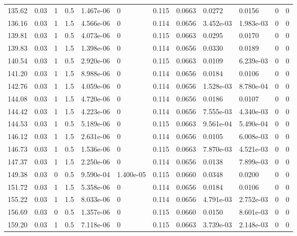 \documentclass[preview]{standalone}
\begin{document}
{{{\begin{tabular}{L{1.2cm}C{1.2cm} C{0.3cm}C{0.5cm} C{1.4cm}C{1.4cm} C{1.4cm}C{1.4cm} C{1.6cm}C{1.6cm} C{1.6cm}C{1.6cm}}
  135.62  &  0.03  & 1     & 0.5 &  1.467e-06  & 0  &  0.115&   0.0663& 0.0272 & 0.0156   &  0 & 0  \\ 
  136.16  &  0.03  & 1     & 1.5 &  4.566e-06  & 0  &  0.114&   0.0656& 3.452e-03 & 1.983e-03   &  0 & 0  \\ 
  139.81  &  0.03  & 1     & 0.5 &  4.073e-06  & 0  &  0.115&   0.0663& 0.0295 & 0.0170   &  0 & 0  \\ 
  139.83  &  0.03  & 1     & 1.5 &  1.398e-06  & 0  &  0.114&   0.0656& 0.0330 & 0.0189   &  0 & 0  \\ 
  140.54  &  0.03  & 1     & 0.5 &  2.920e-06  & 0  &  0.115&   0.0663& 0.0109 & 6.239e-03   &  0 & 0  \\ 
  141.20  &  0.03  & 1     & 1.5 &  8.988e-06  & 0  &  0.114&   0.0656& 0.0184 & 0.0106   &  0 & 0  \\ 
  142.76  &  0.03  & 1     & 1.5 &  4.059e-06  & 0  &  0.114&   0.0656& 1.528e-03 & 8.780e-04   &  0 & 0  \\ 
  144.08  &  0.03  & 1     & 1.5 &  4.720e-06  & 0  &  0.114&   0.0656& 0.0186 & 0.0107   &  0 & 0  \\ 
  144.42  &  0.03  & 1     & 1.5 &  4.223e-06  & 0  &  0.114&   0.0656& 7.555e-03 & 4.340e-03   &  0 & 0  \\ 
  144.53  &  0.03  & 1     & 0.5 &  5.189e-06  & 0  &  0.115&   0.0663& 9.561e-04 & 5.490e-04   &  0 & 0  \\ 
  146.12  &  0.03  & 1     & 1.5 &  2.631e-06  & 0  &  0.114&   0.0656& 0.0105 & 6.008e-03   &  0 & 0  \\ 
  146.73  &  0.03  & 1     & 0.5 &  1.536e-06  & 0  &  0.115&   0.0663& 7.870e-03 & 4.521e-03   &  0 & 0  \\ 
  147.37  &  0.03  & 1     & 1.5 &  2.250e-06  & 0  &  0.114&   0.0656& 0.0138 & 7.899e-03   &  0 & 0  \\ 
  149.38  &  0.03  & 0     & 0.5 &  9.590e-04  & 1.400e-05  &  0.115&   0.0660& 0.0348 & 0.0200   &  0 & 0  \\ 
  151.72  &  0.03  & 1     & 1.5 &  5.358e-06  & 0  &  0.114&   0.0656& 0.0184 & 0.0106   &  0 & 0  \\ 
  155.22  &  0.03  & 1     & 1.5 &  8.033e-06  & 0  &  0.114&   0.0656& 4.791e-03 & 2.752e-03   &  0 & 0  \\ 
  156.69  &  0.03  & 0     & 0.5 &  1.357e-06  & 0  &  0.115&   0.0660& 0.0150 & 8.601e-03   &  0 & 0  \\ 
  159.20  &  0.03  & 1     & 0.5 &  7.118e-06  & 0  &  0.115&   0.0663& 3.739e-03 & 2.148e-03   &  0 & 0  \\ 

\end{tabular}}}}
\end{document}
